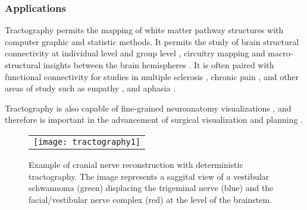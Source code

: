\subsubsection{Applications}
Tractography permits the mapping of white matter pathway structures with computer graphic and statistic methods. It permits the study of brain structural connectivity at individual level \cite{Boorman2007} and group level \cite{Meskaldji2013},  circuitry mapping \cite{Kirsch2015} and macro-structural insights between the brain hemispheres \cite{Kucyi2012a}. It is often paired with functional connectivity for studies in multiple sclerosis \cite{Zhong2016,Rocca2007a}, chronic pain \cite{Mansour2013,Seifert2011,Wiech2014}, and other areas of study such as empathy \cite{Bernhardt2014}, and aphasia \cite{Catani2013c}.

Tractography is also capable of fine-grained neuroanatomy visualizations \cite{Hodaie2010, Chen2015c}, and therefore is important in the advancement of surgical visualization \cite{Chen2011b,Rosen2015,Hodaie2012g,Taoka2006,Sherbondy2008,Muthusamy2007} and planning \cite{Golby2011}. 

\begin{figure}[ht]
\begin{center}
\begin{tabular}{c}
\texttt{[image: tractography1]}
\end{tabular}
\caption{Example of cranial nerve reconstruction with deterministic tractography. The image represents a saggital view of a vestibular schwannoma (green) displacing the trigeminal nerve (blue) and the facial/vestibular nerve complex (red) at the level of the brainstem. } 
\label{fig:tract1}
\end{center}
\end{figure}

